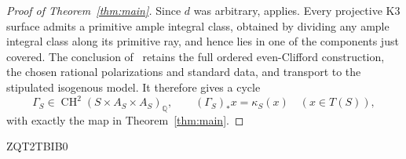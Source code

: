 \documentclass[11pt]{article}
\numberwithin{equation}{section}
\theoremstyle{definition}
\theoremstyle{remark}
\begin{document}
\begin{proof}[Proof of Theorem~\ref{thm:main}]
Since $d$ was arbitrary, \cite[Corollary~1.3]{R} applies.
Every projective K3 surface admits a primitive ample integral
class, obtained by dividing any ample integral class along its
primitive ray, and hence lies in one of the components just
covered. The conclusion of~\cite{R} retains the full ordered
even-Clifford construction, the chosen rational polarizations and
standard data, and transport to the stipulated isogenous model.
It therefore gives a cycle
\[
 \Gamma_S\in\operatorname{CH}^2(S\times A_S\times A_S)_\mathbb Q,
 \qquad (\Gamma_S)_*x=\kappa_S(x)\quad(x\in T(S)),
\]
with exactly the map in Theorem~\ref{thm:main}.
\end{proof}




ZQT2TBIB0
\end{document}
